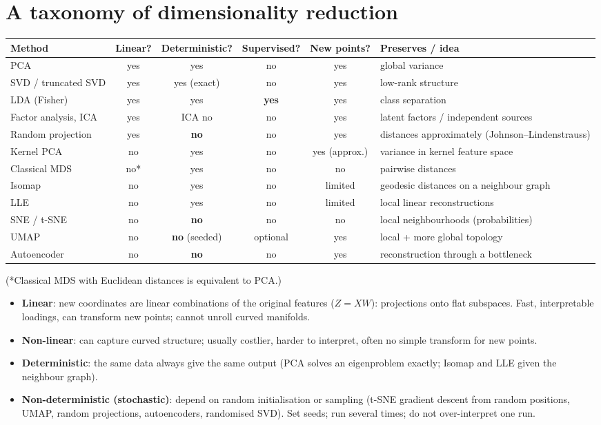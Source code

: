 \section{A taxonomy of dimensionality reduction}
\begin{center}\small
\begin{tabularx}{\linewidth}{l c c c c X}
\toprule
Method & Linear? & Deterministic? & Supervised? & New points? & Preserves / idea\\
\midrule
PCA & yes & yes & no & yes & global variance\\
SVD / truncated SVD & yes & yes (exact) & no & yes & low-rank structure\\
LDA (Fisher) & yes & yes & \textbf{yes} & yes & class separation\\
Factor analysis, ICA & yes & ICA no & no & yes & latent factors / independent sources\\
Random projection & yes & \textbf{no} & no & yes & distances approximately (Johnson--Lindenstrauss)\\
Kernel PCA & no & yes & no & yes (approx.) & variance in kernel feature space\\
Classical MDS & no* & yes & no & no & pairwise distances\\
Isomap & no & yes & no & limited & geodesic distances on a neighbour graph\\
LLE & no & yes & no & limited & local linear reconstructions\\
SNE / t-SNE & no & \textbf{no} & no & no & local neighbourhoods (probabilities)\\
UMAP & no & \textbf{no} (seeded) & optional & yes & local + more global topology\\
Autoencoder & no & \textbf{no} & no & yes & reconstruction through a bottleneck\\
\bottomrule
\end{tabularx}
\end{center}
(*Classical MDS with Euclidean distances is equivalent to PCA.)
\begin{itemize}
\item \textbf{Linear}: new coordinates are linear combinations of the original features ($Z = XW$): projections onto flat subspaces. Fast, interpretable loadings, can
  transform new points; cannot unroll curved manifolds.
\item \textbf{Non-linear}: can capture curved structure; usually costlier, harder to interpret, often no simple transform for new points.
\item \textbf{Deterministic}: the same data always give the same output (PCA solves an eigenproblem exactly; Isomap and LLE given the neighbour graph).
\item \textbf{Non-deterministic (stochastic)}: depend on random initialisation or sampling (t-SNE gradient descent from random positions, UMAP, random projections,
  autoencoders, randomised SVD). Set seeds; run several times; do not over-interpret one run.
\end{itemize}

